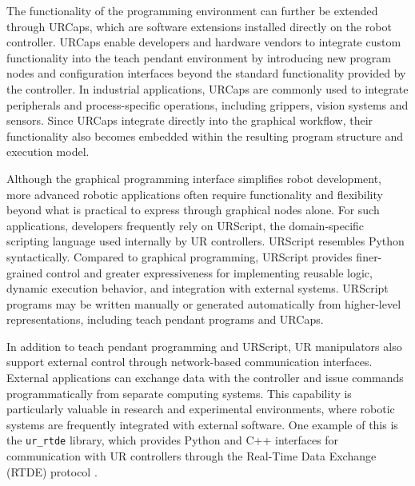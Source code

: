 The functionality of the programming environment can further be extended through URCaps, which are software extensions installed directly on the robot controller. URCaps enable developers and hardware vendors to integrate custom functionality into the teach pendant environment by introducing new program nodes and configuration interfaces beyond the standard functionality provided by the controller. In industrial applications, URCaps are commonly used to integrate peripherals and process-specific operations, including grippers, vision systems and sensors. Since URCaps integrate directly into the graphical workflow, their functionality also becomes embedded within the resulting program structure and execution model.

Although the graphical programming interface simplifies robot development, more advanced robotic applications often require functionality and flexibility beyond what is practical to express through graphical nodes alone. For such applications, developers frequently rely on URScript, the domain-specific scripting language used internally by UR controllers. URScript resembles Python syntactically. Compared to graphical programming, URScript provides finer-grained control and greater expressiveness for implementing reusable logic, dynamic execution behavior, and integration with external systems. URScript programs may be written manually or generated automatically from higher-level representations, including teach pendant programs and URCaps.

In addition to teach pendant programming and URScript, UR manipulators also support external control through network-based communication interfaces. External applications can exchange data with the controller and issue commands programmatically from separate computing systems. This capability is particularly valuable in research and experimental environments, where robotic systems are frequently integrated with external software. One example of this is the \texttt{ur\_rtde} library, which provides Python and C++ interfaces for communication with UR controllers through the Real-Time Data Exchange (RTDE) protocol \cite{lindvig2025ur_rtde}.